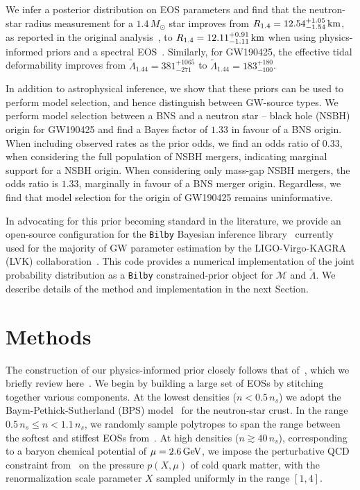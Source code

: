 \documentclass[twocolumn,linenumbers]{aastex631}
\begin{document}
We infer a posterior distribution on EOS parameters and find that the
neutron-star radius measurement for a $1.4\,{M_\odot}$ star improves from
${R_{1.4}}=12.54^{+1.05}_{-1.54}\,{\rm km}$, as reported in the original
analysis~\citep{abbott19_170817Properties}, to
${R_{1.4}}=12.11^{+0.91}_{-1.11}\,{\rm km}$ when using physics-informed
priors and a spectral EOS~\citep[see also][for some of the first
  estimates made after the GW170817
  event]{Most2018,Capano2020}. Similarly, for GW190425, the effective
tidal deformability improves from $\tilde{\Lambda}_{1.44} =
381^{+1065}_{-271}$ to $\tilde{\Lambda}_{1.44} = 183^{+180}_{-100}$.

In addition to astrophysical inference, we show that these priors can be
used to perform model selection, and hence distinguish between GW-source
types. We perform model selection between a BNS and a neutron star --
black hole (NSBH) origin for GW190425 and find a Bayes factor of $1.33$
in favour of a BNS origin. When including observed rates as the prior odds,
we find an odds ratio of $0.33$, when considering the full population of
NSBH mergers, indicating marginal support for a NSBH origin.  When
considering only mass-gap NSBH mergers, the odds ratio is $1.33$,
marginally in favour of a BNS merger origin. Regardless, we find that
model selection for the origin of GW190425 remains uninformative.
	
In advocating for this prior becoming standard in the literature, we
provide an open-source configuration for the \texttt{Bilby} Bayesian
inference library~\citep{ashton19,romeroshaw20} currently used for the
majority of GW parameter estimation by the LIGO-Virgo-KAGRA (LVK)
collaboration~\citep[e.g.,][]{LIGO, Virgo, KAGRA}. This code provides a
numerical implementation of the joint probability distribution as a
\texttt{Bilby} constrained-prior object for $\mathcal{M}$ and
$\tilde{\Lambda}$. We describe details of the method and implementation
in the next Section.


\section{Methods}
\label{sec:Methods}
	
The construction of our physics-informed prior closely follows that
of~\citet{Altiparmak:2022}, which we briefly review here~\citep[see][for
  additional details]{Ecker:2022, Ecker:2022dlg}. We begin by building a
large set of EOSs by stitching together various components. At the
lowest densities ($n<0.5\,n_s$) we adopt the Baym-Pethick-Sutherland
(BPS) model~\citep{Baym71} for the neutron-star crust. In the range
$0.5\,n_s\le n < 1.1\,n_s$, we randomly sample polytropes to span the
range between the softest and stiffest EOSs
from~\citet{Hebeler:2013nza}. At high densities ($n \gtrsim 40\,n_s$),
corresponding to a baryon chemical potential of $\mu = 2.6\,\rm GeV$, we
impose the perturbative QCD constraint from~\citet{Fraga2014} on the
pressure $p(X, \mu)$ of cold quark matter, with the renormalization scale
parameter $X$ sampled uniformly in the range $[1,4]$.
	
\end{document}
